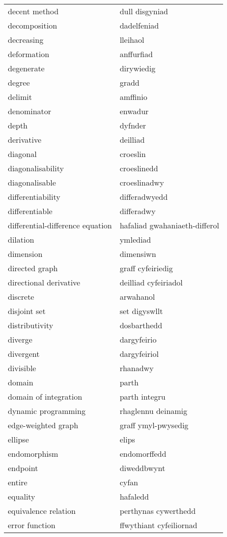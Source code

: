 \begin{supertabular}{p{0.22\textwidth}p{0.22\textwidth}}
decent method & dull disgyniad \\
decomposition & dadelfeniad \\
decreasing & lleihaol \\
deformation & anffurfiad \\
degenerate & dirywiedig \\
degree & gradd \\
delimit & amffinio \\
denominator & enwadur \\
depth & dyfnder \\
derivative & deilliad \\
diagonal & croeslin \\
diagonalisability & croeslinedd \\
diagonalisable & croeslinadwy \\
differentiability & differadwyedd \\
differentiable & differadwy \\
differential-difference equation & hafaliad gwahaniaeth-differol \\
dilation & ymlediad \\
dimension & dimensiwn \\
directed graph & graff cyfeiriedig \\
directional derivative & deilliad cyfeiriadol \\
discrete & arwahanol \\
disjoint set & set digyswllt \\
distributivity & dosbarthedd \\
diverge & dargyfeirio \\
divergent & dargyfeiriol \\
divisible & rhanadwy \\
domain & parth \\
domain of integration & parth integru \\
dynamic programming & rhaglennu deinamig \\
edge-weighted graph & graff ymyl-pwysedig \\
ellipse & elips \\
endomorphism & endomorffedd \\
endpoint & diweddbwynt \\
entire & cyfan \\
equality & hafaledd \\
equivalence relation & perthynas cywerthedd \\
error function & ffwythiant cyfeiliornad \\

\end{supertabular}

